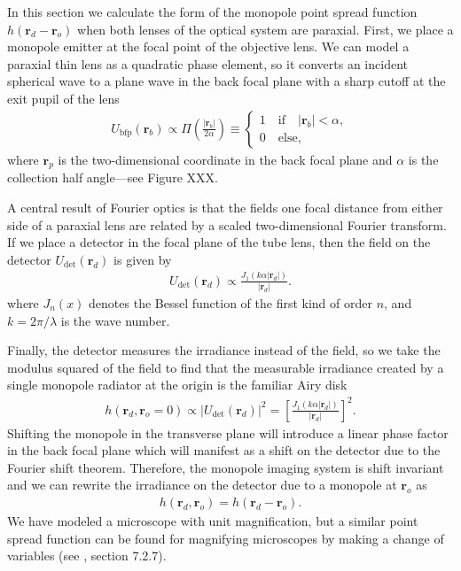 \documentclass[]{osa-article}
\providecommand{\mb}[1]{\mathbf{#1}}
\providecommand{\ro}{\mathbf{\mathbf{r}}_o}
\providecommand{\rp}{\mathbf{r}_p}
\providecommand{\rd}{\mathbf{r}_d}
\begin{document}
In this section we calculate the form of the monopole point spread function
$h(\rd - \ro)$ when both lenses of the optical system are paraxial. First, we
place a monopole emitter at the focal point of the objective lens. We can model
a paraxial thin lens as a quadratic phase element, so it converts an incident
spherical wave to a plane wave in the back focal plane with a sharp cutoff at
the exit pupil of the lens
\begin{align}
  U_{\text{bfp}}(\mb{r}_b) \propto \Pi\left(\frac{|\mb{r}_b|}{2\alpha}\right) \equiv
  \begin{cases}
    1\quad \text{if}\quad |\mb{r}_b| < \alpha,\\
    0\quad \text{else},
  \end{cases}
\end{align}
where $\rp$ is the two-dimensional coordinate in the back focal plane and
$\alpha$ is the collection half angle---see Figure XXX. 

A central result of Fourier optics is that the fields one focal distance from
either side of a paraxial lens are related by a scaled two-dimensional Fourier
transform. If we place a detector in the focal plane of the tube lens, then the
field on the detector $U_{\text{det}}(\mb{r}_d)$ is given by
\begin{align}
  U_{\text{det}}(\mb{r}_d) \propto \frac{J_1(k\alpha|\mb{r}_d|)}{|\mb{r}_d|}.
\end{align}
where $J_n(x)$ denotes the Bessel function of the first kind of order $n$, and
$k = 2\pi/\lambda$ is the wave number.

Finally, the detector measures the irradiance instead of the field, so we take
the modulus squared of the field to find that the measurable irradiance created
by a single monopole radiator at the origin is the familiar Airy disk
\begin{align}
  h(\mb{r}_d, \ro = 0) \propto |U_{\text{det}}(\mb{r}_d)|^2 = \left[\frac{J_1(k\alpha|\mb{r}_d|)}{|\mb{r}_d|}\right]^2.
\end{align}
Shifting the monopole in the transverse plane will introduce a linear phase
factor in the back focal plane which will manifest as a shift on the detector
due to the Fourier shift theorem. Therefore, the monopole imaging system is
shift invariant and we can rewrite the irradiance on the detector due to a
monopole at $\ro$ as
\begin{align}
  h(\rd, \ro) = h(\rd - \ro). \label{eq:shift}
\end{align}
We have modeled a microscope with unit magnification, but a similar point spread
function can be found for magnifying microscopes by making a change of
variables (see \cite{barrett2004}, section 7.2.7).
\end{document}
